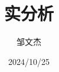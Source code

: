 \documentclass[lang=cn,newtx,10pt,sCheme=Chinese]{../../Template/elegantbook}
\title{实分析}
\author{邹文杰}
\institute{无}
\date{2024/10/25}
\begin{document}

\maketitle
\frontmatter

\tableofcontents%

\mainmatter
\everymath{\displaystyle} %






% 

% 

% 

% 

% 

% 

% 

% 

% 

% 

% 



\end{document}
